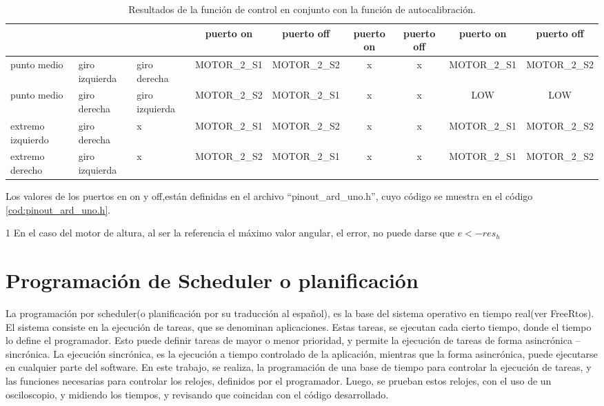 \begin{table}[ht]
{\begin{threeparttable}
\begin{tabular}{|p{1.5cm}|p{1.5cm}|p{1.5cm}|c|c|c|c|c|c|}
		& &  & puerto on & puerto off &puerto on & puerto off&puerto on & puerto off\\ 
		\hline 
		punto medio & giro izquierda & giro derecha &  MOTOR\_2\_S1 &  MOTOR\_2\_S2  & x & x &MOTOR\_2\_S1 &MOTOR\_2\_S2 \\ 
		\hline 
		punto medio & giro derecha & giro izquierda & MOTOR\_2\_S2 & MOTOR\_2\_S1 & x & x & LOW &LOW \\ 
		\hline  
		extremo izquierdo & giro derecha &x & MOTOR\_2\_S1 & MOTOR\_2\_S2  &   x  & x  &MOTOR\_2\_S1 &MOTOR\_2\_S2 \\ 
		\hline 
		extremo derecho & giro izquierda & x & MOTOR\_2\_S2 & MOTOR\_2\_S1  & x  & x  &MOTOR\_2\_S1 &MOTOR\_2\_S2 \\ 
		\hline 
	\end{tabular}
	\begin{tablenotes}
	 	\small 
	 	\item Los valores de los puertos en on y off,están definidas en el archivo ``pinout\_ard\_uno.h'', cuyo código se muestra en el código  \ref{cod:pinout_ard_uno.h}.
	 	
	 	\item [1] En el caso del motor de altura, al ser la referencia el máximo valor angular, el error, no puede darse que $e < -res_h $  
	\end{tablenotes}
	\end{threeparttable}
}	
	\caption{Resultados de la función de control en conjunto con la función de autocalibración.}
	\label{tab:result_control}
\end{table}


\section{Programación de Scheduler o planificación}

La programación por scheduler(o planificación por su traducción al español), es la base del sistema operativo en tiempo real(ver FreeRtos). El sistema consiste en la ejecución de tareas, que se denominan aplicaciones. Estas tareas, se ejecutan cada cierto tiempo, donde el tiempo lo define el programador. Esto puede definir tareas de mayor o menor prioridad, y permite la ejecución de tareas de forma asincrónica – sincrónica. La ejecución sincrónica, es la ejecución a tiempo controlado de la aplicación, mientras que la forma asincrónica, puede ejecutarse en cualquier parte del software. En este trabajo, se realiza, la programación de una base de tiempo para controlar la ejecución de tareas, y las funciones necesarias para controlar los relojes, definidos por el programador. Luego, se prueban estos relojes, con el uso de un osciloscopio, y midiendo los tiempos, y revisando que coincidan con el código desarrollado. 

